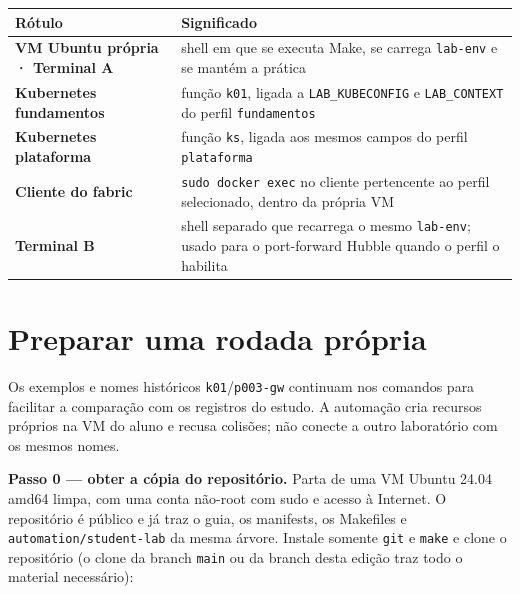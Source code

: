 \documentclass[12pt,openany,oneside,a4paper,chapter=TITLE,english,brazil]{abntex2}
\begin{document}
\begin{quadro}[!htbp]
\caption{Rótulos que indicam onde cada comando roda}
\footnotesize
\begin{tabularx}{\textwidth}{|>{\raggedright\arraybackslash\hsize=0.712\hsize}X|>{\raggedright\arraybackslash\hsize=1.288\hsize}X|}
\hline
\textbf{Rótulo} & \textbf{Significado} \\
\hline
\textbf{VM Ubuntu própria · Terminal A} & shell em que se executa Make, se carrega \texttt{lab-{}\allowbreak{}env}
e se mantém a prática \\
\hline
\textbf{Kubernetes fundamentos} & função \texttt{k01}, ligada a \texttt{LAB\_\allowbreak{}KUBECONFIG} e
\texttt{LAB\_\allowbreak{}CONTEXT} do perfil \texttt{fundamentos} \\
\hline
\textbf{Kubernetes plataforma} & função \texttt{ks}, ligada aos mesmos campos do perfil
\texttt{plataforma} \\
\hline
\textbf{Cliente do fabric} & \texttt{sudo docker exec} no cliente pertencente ao perfil selecionado,
dentro da própria VM \\
\hline
\textbf{Terminal B} & shell separado que recarrega o mesmo \texttt{lab-{}\allowbreak{}env};
usado para o port-forward Hubble quando o perfil o habilita \\
\hline
\end{tabularx}
\end{quadro}

\section*{Preparar uma rodada própria}\label{preparar-uma-rodada-pruxf3pria}

Os exemplos e nomes históricos \texttt{k01}/\texttt{p003-{}\allowbreak{}gw} continuam nos comandos para
facilitar a comparação com os registros do estudo. A automação cria recursos
próprios na VM do aluno e recusa colisões; não conecte a outro laboratório com
os mesmos nomes.

\textbf{Passo 0 --- obter a cópia do repositório.} Parta de uma VM Ubuntu 24.04 amd64
limpa, com uma conta não-root com sudo e acesso à Internet. O repositório é
público e já traz o guia, os manifests, os Makefiles e \texttt{automation/\allowbreak{}student-{}\allowbreak{}lab}
da mesma árvore. Instale somente \texttt{git} e \texttt{make} e clone o repositório (o clone da branch \texttt{main} ou da branch desta edição traz todo o material necessário):
\end{document}
